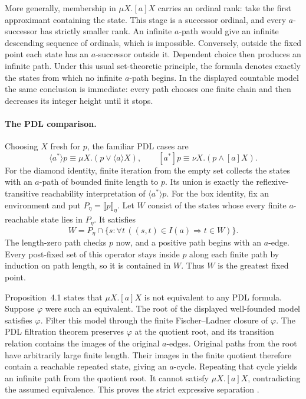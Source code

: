 More generally, membership in \(\mu X.[a]X\) carries
an ordinal rank: take the first approximant containing
the state. This stage is a successor ordinal, and
every \(a\)-successor has strictly smaller rank.
An infinite \(a\)-path would give an infinite
descending sequence of ordinals, which is impossible.
Conversely, outside the fixed point each state has
an \(a\)-successor outside it. Dependent choice then
produces an infinite path. Under this usual set-theoretic
principle, the formula denotes exactly the states
from which no infinite \(a\)-path begins.
In the displayed countable model the same conclusion
is immediate: every path chooses one finite chain
and then decreases its integer height until it stops.

\paragraph{The PDL comparison.}
Choosing \(X\) fresh for \(p\), the familiar PDL cases are
\[
 \langle a^*\rangle p
   \equiv\mu X.(p\lor\langle a\rangle X),
 \qquad
 [a^*]p
   \equiv\nu X.(p\land[a]X).
\]
For the diamond identity, finite iteration from the empty
set collects the states with an \(a\)-path of bounded
finite length to \(p\). Its union is exactly the
reflexive-transitive reachability interpretation of
\(\langle a^*\rangle p\).
For the box identity, fix an environment and put
\(P_\eta=\llbracket p\rrbracket_\eta\). Let \(W\)
consist of the states whose every finite \(a\)-reachable
state lies in \(P_\eta\). It satisfies
\[
 W=P_\eta\cap\{s:\forall t\,((s,t)\in I(a)\Rightarrow t\in W)\}.
\]
The length-zero path checks \(p\) now, and a positive
path begins with an \(a\)-edge. Every post-fixed set of this operator
stays inside \(p\) along each finite path by induction
on path length, so it is contained in \(W\).
Thus \(W\) is the greatest fixed point.

Proposition~4.1 states that \(\mu X.[a]X\) is not
equivalent to any PDL formula. Suppose \(\varphi\)
were such an equivalent. The root of the displayed
well-founded model satisfies \(\varphi\).
Filter this model through the finite Fischer--Ladner
closure of \(\varphi\). The PDL filtration theorem
preserves \(\varphi\) at the quotient root, and its
transition relation contains the images of the
original \(a\)-edges. Original paths from the root
have arbitrarily large finite length. Their images
in the finite quotient therefore contain a reachable
repeated state, giving an \(a\)-cycle. Repeating that
cycle yields an infinite path from the quotient root.
It cannot satisfy \(\mu X.[a]X\), contradicting the
assumed equivalence. This proves the strict expressive
separation \cite[prop.~4.1]{Kozen1983}.

